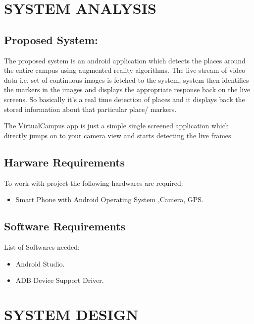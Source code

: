 \documentclass{article}
\begin{document}

\newpage
\section{SYSTEM ANALYSIS }
\subsection{Proposed System: }
\par The proposed system is an android application which detects the places around the entire campus using augmented reality algorithms. The live stream of video data i.e. set of continuous images is fetched to the system, system then identifies the markers in the images and displays the appropriate response back on the live screens. So basically it’s a real time detection of places and it displays back the stored information about that particular place/ markers. 
\par The VirtualCampus app is just a simple single screened application which directly jumps on to your camera view and starts detecting the live frames.   

\subsection{Harware Requirements}
\par To work with project the following hardwares are required:
\begin{itemize}
\item Smart Phone with Android Operating System ,Camera, GPS.
\end{itemize}

\subsection{Software Requirements}
\par List of Softwares needed:
\begin{itemize}
\item Android Studio.
\item ADB Device Support Driver.
\end{itemize}


\newpage
\section{SYSTEM DESIGN }
\end{document}
